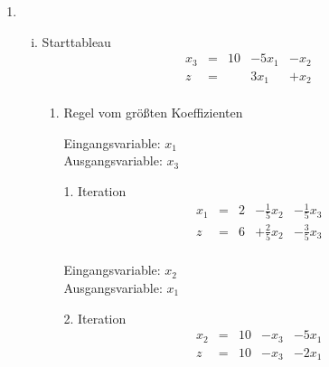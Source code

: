 \documentclass[a4paper]{scrartcl}
\begin{document}
\begin{enumerate}
\begin{enumerate}
\begin{enumerate}[(i)]
                \end{enumerate}

            \item
                \begin{enumerate}[(i)]
                    \item
                        Starttableau
                        \begin{equation}
                            \begin{array}{rcrrr}
                                x_3 & = & 10 & -5x_1 & -x_2 \\
                                \hline
                                z   & = &   & 3x_1 & +x_2 \\
                            \end{array}
                        \end{equation}

                        \begin{enumerate}
                            \item Regel vom größten Koeffizienten

                                Eingangsvariable: $x_1$ \\
                                Ausgangsvariable: $x_3$

                                1. Iteration
                                \begin{equation}
                                    \begin{array}{rcrrr}
                                        x_1 & = & 2 & -\frac{1}{5}x_2 & -\frac{1}{5}x_3 \\
                                        \hline
                                        z   & = & 6 & +\frac{2}{5}x_2 & -\frac{3}{5}x_3 \\
                                    \end{array}
                                \end{equation}

                                Eingangsvariable: $x_2$ \\
                                Ausgangsvariable: $x_1$

                                2. Iteration
                                \begin{equation}
                                    \begin{array}{rcrrr}
                                        x_2 & = & 10 & -x_3 & -5x_1 \\
                                        \hline
                                        z   & = & 10 & -x_3 & -2x_1 \\
                                    \end{array}
                                \end{equation}


\end{enumerate}
\end{enumerate}
\end{enumerate}
\end{enumerate}
\end{document}
